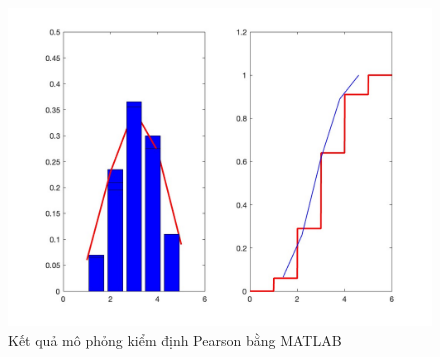 \begin{figure}[h!]
    \centering
    \includegraphics[width=0.8\linewidth]{../../assets/images/main-content-image.jpg}
    \caption{Kết quả mô phỏng kiểm định Pearson bằng MATLAB}
    \label{fig:pearson_test_result}
\end{figure}


